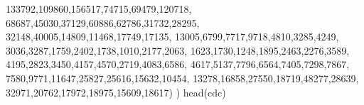 \documentclass[
  letterpaper,
  DIV=11,
  numbers=noendperiod]{scrartcl}
\newenvironment{Shaded}{\begin{snugshade}}{\end{snugshade}}
\newcommand{\DecValTok}[1]{\textcolor[rgb]{0.68,0.00,0.00}{#1}}
\newcommand{\FunctionTok}[1]{\textcolor[rgb]{0.28,0.35,0.67}{#1}}
\newcommand{\NormalTok}[1]{\textcolor[rgb]{0.00,0.23,0.31}{#1}}
\begin{document}
\begin{Shaded}
\begin{Highlighting}[]
                                   \DecValTok{133792}\NormalTok{,}\DecValTok{109860}\NormalTok{,}\DecValTok{156517}\NormalTok{,}\DecValTok{74715}\NormalTok{,}\DecValTok{69479}\NormalTok{,}\DecValTok{120718}\NormalTok{,}
                                   \DecValTok{68687}\NormalTok{,}\DecValTok{45030}\NormalTok{,}\DecValTok{37129}\NormalTok{,}\DecValTok{60886}\NormalTok{,}\DecValTok{62786}\NormalTok{,}\DecValTok{31732}\NormalTok{,}\DecValTok{28295}\NormalTok{,}
                                   \DecValTok{32148}\NormalTok{,}\DecValTok{40005}\NormalTok{,}\DecValTok{14809}\NormalTok{,}\DecValTok{11468}\NormalTok{,}\DecValTok{17749}\NormalTok{,}\DecValTok{17135}\NormalTok{,}
                                   \DecValTok{13005}\NormalTok{,}\DecValTok{6799}\NormalTok{,}\DecValTok{7717}\NormalTok{,}\DecValTok{9718}\NormalTok{,}\DecValTok{4810}\NormalTok{,}\DecValTok{3285}\NormalTok{,}\DecValTok{4249}\NormalTok{,}
                                   \DecValTok{3036}\NormalTok{,}\DecValTok{3287}\NormalTok{,}\DecValTok{1759}\NormalTok{,}\DecValTok{2402}\NormalTok{,}\DecValTok{1738}\NormalTok{,}\DecValTok{1010}\NormalTok{,}\DecValTok{2177}\NormalTok{,}\DecValTok{2063}\NormalTok{,}
                                   \DecValTok{1623}\NormalTok{,}\DecValTok{1730}\NormalTok{,}\DecValTok{1248}\NormalTok{,}\DecValTok{1895}\NormalTok{,}\DecValTok{2463}\NormalTok{,}\DecValTok{2276}\NormalTok{,}\DecValTok{3589}\NormalTok{,}
                                   \DecValTok{4195}\NormalTok{,}\DecValTok{2823}\NormalTok{,}\DecValTok{3450}\NormalTok{,}\DecValTok{4157}\NormalTok{,}\DecValTok{4570}\NormalTok{,}\DecValTok{2719}\NormalTok{,}\DecValTok{4083}\NormalTok{,}\DecValTok{6586}\NormalTok{,}
                                   \DecValTok{4617}\NormalTok{,}\DecValTok{5137}\NormalTok{,}\DecValTok{7796}\NormalTok{,}\DecValTok{6564}\NormalTok{,}\DecValTok{7405}\NormalTok{,}\DecValTok{7298}\NormalTok{,}\DecValTok{7867}\NormalTok{,}
                                   \DecValTok{7580}\NormalTok{,}\DecValTok{9771}\NormalTok{,}\DecValTok{11647}\NormalTok{,}\DecValTok{25827}\NormalTok{,}\DecValTok{25616}\NormalTok{,}\DecValTok{15632}\NormalTok{,}\DecValTok{10454}\NormalTok{,}
                                   \DecValTok{13278}\NormalTok{,}\DecValTok{16858}\NormalTok{,}\DecValTok{27550}\NormalTok{,}\DecValTok{18719}\NormalTok{,}\DecValTok{48277}\NormalTok{,}\DecValTok{28639}\NormalTok{,}
                                   \DecValTok{32971}\NormalTok{,}\DecValTok{20762}\NormalTok{,}\DecValTok{17972}\NormalTok{,}\DecValTok{18975}\NormalTok{,}\DecValTok{15609}\NormalTok{,}\DecValTok{18617}\NormalTok{)}
\NormalTok{)}
\FunctionTok{head}\NormalTok{(cdc)}
\end{Highlighting}
\end{Shaded}
\end{document}
